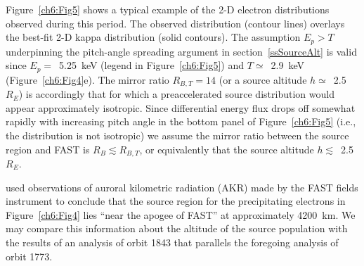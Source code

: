   \begin{figure}
    \centering {}
  \end{figure}


  Figure~\ref{ch6:Fig5} shows a typical example of the 2-D electron
  distributions observed during this period. The observed distribution (contour
  lines) overlays the best-fit 2-D kappa distribution (solid contours). The
  assumption $E_p > T$ underpinning the pitch-angle spreading argument in
  section~\ref{ssSourceAlt} is valid since $E_p =$~5.25~keV (legend in
  Figure~\ref{ch6:Fig5}) and $T \simeq$~2.9~keV (Figure~\ref{ch6:Fig4}e). The
  mirror ratio $R_{B,T} = 14$ (or a source altitude $h \simeq$~2.5~$R_E$) is
  accordingly that for which a preaccelerated source distribution would appear
  approximately isotropic. Since differential energy flux drops off somewhat
  rapidly with increasing pitch angle in the bottom panel of
  Figure~\ref{ch6:Fig5} (i.e., the distribution is not isotropic) we assume the
  mirror ratio between the source region and FAST is $R_B \lesssim R_{B,T}$, or
  equivalently that the source altitude $h \lesssim$~2.5~$R_E$.

  \citet{Ergun1998} used observations of auroral kilometric radiation (AKR) made
  by the FAST fields instrument \citep{Ergun2001} to conclude that the source
  region for the precipitating electrons in Figure~\ref{ch6:Fig4} lies ``near
  the apogee of FAST'' at approximately 4200~km. We may compare this information
  about the altitude of the source population with the results of an analysis of
  orbit 1843 that parallels the foregoing analysis of orbit 1773.

